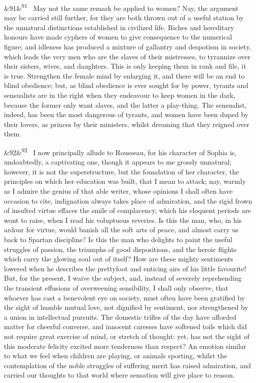 \documentclass[12pt]{article}
\newcommand{\para}[1][]{\par\noindent\ifx&#1&\else\textsuperscript{\footnotesize #1}~\fi}
\begin{document}
\para[91] May not the same remark be applied to women? Nay, the argument may be carried still further, for they are both thrown out of a useful station by the unnatural distinctions established in civilized life. Riches and hereditary honours have made cyphers of women to give consequence to the numerical figure; and idleness has produced a mixture of gallantry and despotism in society, which leads the very men who are the slaves of their mistresses, to tyrannize over their sisters, wives, and daughters. This is only keeping them in rank and file, it is true. Strengthen the female mind by enlarging it, and there will be an end to blind obedience; but, as blind obedience is ever sought for by power, tyrants and sensualists are in the right when they endeavour to keep women in the dark, because the former only want slaves, and the latter a play-thing. The sensualist, indeed, has been the most dangerous of tyrants, and women have been duped by their lovers, as princes by their ministers, whilst dreaming that they reigned over them.

\para[92] I now principally allude to Rousseau, for his character of Sophia is, undoubtedly, a captivating one, though it appears to me grossly unnatural; however, it is not the superstructure, but the foundation of her character, the principles on which her education was built, that I mean to attack; nay, warmly as I admire the genius of that able writer, whose opinions I shall often have occasion to cite, indignation always takes place of admiration, and the rigid frown of insulted virtue effaces the smile of complacency, which his eloquent periods are wont to raise, when I read his voluptuous reveries. Is this the man, who, in his ardour for virtue, would banish all the soft arts of peace, and almost carry us back to Spartan discipline? Is this the man who delights to paint the useful struggles of passion, the triumphs of good dispositions, and the heroic flights which carry the glowing soul out of itself? How are these mighty sentiments lowered when he describes the prettyfoot and enticing airs of his little favourite! But, for the present, I waive the subject, and, instead of severely reprehending the transient effusions of overweening sensibility, I shall only observe, that whoever has cast a benevolent eye on society, must often have been gratified by the sight of humble mutual love, not dignified by sentiment, nor strengthened by a union in intellectual pursuits. The domestic trifles of the day have afforded matter for cheerful converse, and innocent caresses have softened toils which did not require great exercise of mind, or stretch of thought: yet, has not the sight of this moderate felicity excited more tenderness than respect? An emotion similar to what we feel when children are playing, or animals sporting, whilst the contemplation of the noble struggles of suffering merit has raised admiration, and carried our thoughts to that world where sensation will give place to reason.
\end{document}
